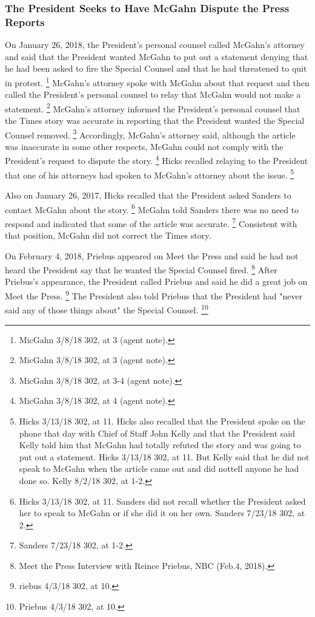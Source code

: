 {\subsubsection{The President Seeks to Have McGahn Dispute the Press Reports}

On January 26, 2018, the President's personal counsel called McGahn's attorney and said that the President wanted McGahn to put out a statement denying that he had been asked to fire the Special Counsel and that he had threatened to quit in protest.%
\footnote{MicGahn 3/8/18 302, at 3 (agent note).}
McGahn's attorney spoke with McGahn about that request and then called the President's personal counsel to relay that McGahn would not make a statement.%
\footnote{MicGahn 3/8/18 302, at 3 (agent note).}
McGahn's attorney informed the President's personal counsel that the Times story was accurate in reporting that the President wanted the Special Counsel removed.%
\footnote{MicGahn 3/8/18 302, at 3-4 (agent note).}
Accordingly, McGahn's attorney said, although the article was inaccurate in some other respects, McGahn could not comply with the President's request to dispute the story.%
\footnote{MicGahn 3/8/18 302, at 4 (agent note).}
Hicks recalled relaying to the President that one of his attorneys had spoken to McGahn's attorney about the issue.%
\footnote{Hicks 3/13/18 302, at 11.
Hicks also recalled that the President spoke on the phone that day with Chief of Staff John Kelly and that the President said Kelly told him that McGahn had totally refuted the story and was going to put out a statement.
Hicks 3/13/18 302, at 11.
But Kelly said that he did not speak to McGahn when the article came out and did nottell anyone he had done so.
Kelly 8/2/18 302, at 1-2.}

Also on January 26, 2017, Hicks recalled that the President asked Sanders to contact McGahn about the story.%
\footnote{Hicks 3/13/18 302, at 11.
Sanders did not recall whether the President asked her to speak to McGahn or if she did it on her own.
Sanders 7/23/18 302, at 2.}
McGahn told Sanders there was no need to respond and indicated that some of the article was accurate.%
\footnote{Sanders 7/23/18 302, at 1-2.}
Consistent with that position, McGahn did not correct the Times story.

On February 4, 2018, Priebus appeared on Meet the Press and said he had not heard the President say that he wanted the Special Counsel fired.%
\footnote{Meet the Press Interview with Reince Priebus, NBC (Feb.4, 2018).}
After Priebus's appearance, the President called Priebus and said he did a great job on Meet the Press.%
\footnote{riebus 4/3/18 302, at 10.}
The President also told Priebus that the President had "never said any of those things about" the Special Counsel.%
\footnote{Priebus 4/3/18 302, at 10.}

}
